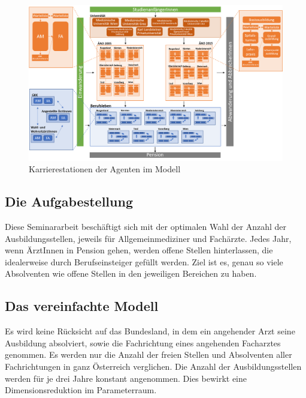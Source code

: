 \documentclass[a4paper,12pt]{article}
\begin{document}
\begin{figure}[h]
\includegraphics[width=\textwidth]{modellgraph.png}
\caption{Karrierestationen der Agenten im Modell}
\end{figure}


\subsection{Die Aufgabestellung}


Diese Seminararbeit beschäftigt sich mit der optimalen Wahl der Anzahl der Ausbildungsstellen, jeweils für Allgemeinmediziner und Fachärzte. Jedes Jahr, wenn ÄrztInnen in Pension gehen, werden offene Stellen hinterlassen, die idealerweise durch Berufseinsteiger gefüllt werden. Ziel ist es, genau so viele Absolventen wie offene Stellen in den jeweiligen Bereichen zu haben.

\subsection{Das vereinfachte Modell}

Es wird keine Rücksicht auf das Bundesland, in dem ein angehender Arzt seine Ausbildung absolviert, sowie die Fachrichtung eines angehenden Facharztes genommen. Es werden nur die Anzahl der freien Stellen und Absolventen aller Fachrichtungen in ganz Österreich verglichen. Die Anzahl der Ausbildungsstellen werden für je drei Jahre konstant angenommen. Dies bewirkt eine Dimensionsreduktion im Parameterraum.
\end{document}

